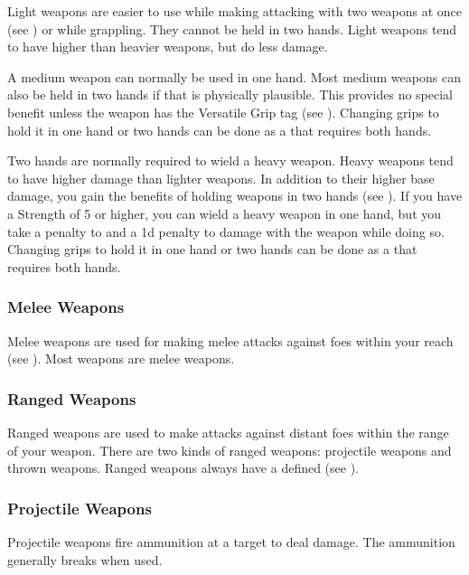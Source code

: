             \label{Light Weapons} Light weapons are easier to use while making attacking with two weapons at once (see ) or while grappling.
            They cannot be held in two hands.
            Light weapons tend to have higher  than heavier weapons, but do less damage.

             A medium weapon can normally be used in one hand.
            Most medium weapons can also be held in two hands if that is physically plausible.
            This provides no special benefit unless the weapon has the Versatile Grip tag (see ).
            Changing grips to hold it in one hand or two hands can be done as a  that requires both hands.

             Two hands are normally required to wield a heavy weapon.
            Heavy weapons tend to have higher damage than lighter weapons.
            In addition to their higher base damage, you gain the benefits of holding weapons in two hands (see ).
            If you have a Strength of 5 or higher, you can wield a heavy weapon in one hand, but you take a  penalty to  and a \minus1d penalty to damage with the weapon while doing so.
            Changing grips to hold it in one hand or two hands can be done as a  that requires both hands.

        \subsubsection{Melee Weapons}
            Melee weapons are used for making melee attacks against foes within your reach (see ). Most weapons are melee weapons.

        \subsubsection{Ranged Weapons}
            Ranged weapons are used to make attacks against distant foes within the range of your weapon. There are two kinds of ranged weapons: projectile weapons and thrown weapons.
            Ranged weapons always have a defined  (see ).

            \subsubsection{Projectile Weapons} Projectile weapons fire ammunition at a target to deal damage. The ammunition generally breaks when used.

